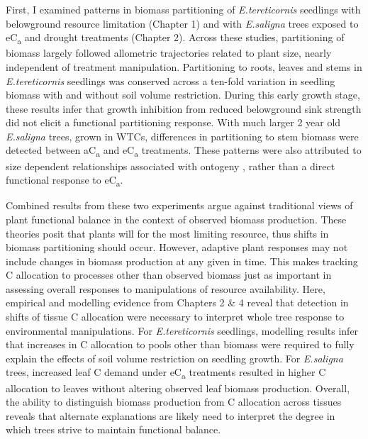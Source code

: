 \documentclass[a4paper]{article}\usepackage[]{graphicx}\usepackage[]{color}
\begin{document}
First, I examined patterns in biomass partitioning of \textit{E.tereticornis} seedlings with belowground resource limitation (Chapter 1) and with \textit{E.saligna} trees exposed to eC\textsubscript{a} and drought treatments (Chapter 2). Across these studies, partitioning of biomass largely followed allometric trajectories related to plant size, nearly independent of treatment manipulation. Partitioning to roots, leaves and stems in \textit{E.tereticornis} seedlings was conserved across a ten-fold variation in seedling biomass with and without soil volume restriction. During this early growth stage, these results infer that growth inhibition from reduced belowground sink strength did not elicit a functional partitioning response. With much larger 2 year old \textit{E.saligna} trees, grown in WTCs, differences in partitioning to stem biomass were detected between aC\textsubscript{a} and eC\textsubscript{a} treatments. These patterns were also attributed to size dependent relationships associated with ontogeny \citep[see]{poorter2015does}, rather than a direct functional response to eC\textsubscript{a}.

Combined results from these two experiments argue against traditional views of plant functional balance in the context of observed biomass production. These theories posit that plants will  for the most limiting resource, thus shifts in biomass partitioning should occur. However, adaptive plant responses may not include changes in biomass production at any given  in time.  This makes tracking C allocation to processes other than observed biomass just as important in assessing overall responses to manipulations of resource availability. Here, empirical and modelling evidence from Chapters 2 \& 4 reveal that detection in shifts of tissue C allocation were necessary to interpret whole tree response to environmental manipulations. For \textit{E.tereticornis} seedlings, modelling results infer that increases in C allocation to pools other than biomass were required to fully explain the effects of soil volume restriction on seedling growth. For \textit{E.saligna} trees, increased leaf C demand under eC\textsubscript{a} treatments resulted in higher C allocation to leaves without altering observed leaf biomass production. Overall, the ability to distinguish biomass production from C allocation across tissues reveals that alternate explanations are likely need to interpret the degree in which trees strive to maintain functional balance.
\end{document}
